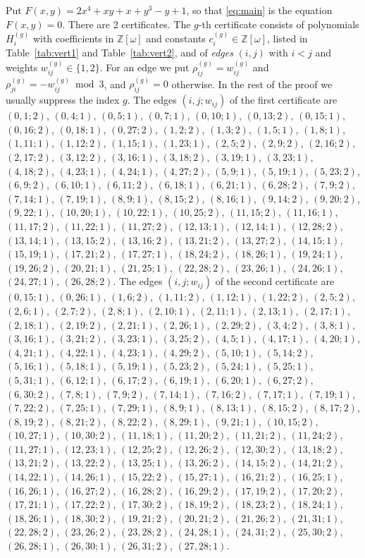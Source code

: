 \documentclass[11pt]{article}
\newcommand{\Z}{\mathbb{Z}}
\begin{document}
Put $F(x,y)=2x^{4}+xy+x+y^{3}-y+1$, so that \eqref{eq:main} is the equation $F(x,y)=0$. There are 2 certificates. The $g$-th certificate consists of polynomials $H^{(g)}_i$ with coefficients in $\Z[\omega]$ and constants $c^{(g)}_i\in\Z[\omega]$, listed in Table~\ref{tab:vert1} and Table~\ref{tab:vert2}, and of \emph{edges} $(i,j)$ with $i<j$ and weights $w^{(g)}_{ij}\in\{1,2\}$. For an edge we put $\rho^{(g)}_{ij}=w^{(g)}_{ij}$ and $\rho^{(g)}_{ji}=-w^{(g)}_{ij}\bmod3$, and $\rho^{(g)}_{ij}=0$ otherwise. In the rest of the proof we usually suppress the index $g$.
The edges $(i,j;w_{ij})$ of the first certificate are $(0,1;2)$, $(0,4;1)$, $(0,5;1)$, $(0,7;1)$, $(0,10;1)$, $(0,13;2)$, $(0,15;1)$, $(0,16;2)$, $(0,18;1)$, $(0,27;2)$, $(1,2;2)$, $(1,3;2)$, $(1,5;1)$, $(1,8;1)$, $(1,11;1)$, $(1,12;2)$, $(1,15;1)$, $(1,23;1)$, $(2,5;2)$, $(2,9;2)$, $(2,16;2)$, $(2,17;2)$, $(3,12;2)$, $(3,16;1)$, $(3,18;2)$, $(3,19;1)$, $(3,23;1)$, $(4,18;2)$, $(4,23;1)$, $(4,24;1)$, $(4,27;2)$, $(5,9;1)$, $(5,19;1)$, $(5,23;2)$, $(6,9;2)$, $(6,10;1)$, $(6,11;2)$, $(6,18;1)$, $(6,21;1)$, $(6,28;2)$, $(7,9;2)$, $(7,14;1)$, $(7,19;1)$, $(8,9;1)$, $(8,15;2)$, $(8,16;1)$, $(9,14;2)$, $(9,20;2)$, $(9,22;1)$, $(10,20;1)$, $(10,22;1)$, $(10,25;2)$, $(11,15;2)$, $(11,16;1)$, $(11,17;2)$, $(11,22;1)$, $(11,27;2)$, $(12,13;1)$, $(12,14;1)$, $(12,28;2)$, $(13,14;1)$, $(13,15;2)$, $(13,16;2)$, $(13,21;2)$, $(13,27;2)$, $(14,15;1)$, $(15,19;1)$, $(17,21;2)$, $(17,27;1)$, $(18,24;2)$, $(18,26;1)$, $(19,24;1)$, $(19,26;2)$, $(20,21;1)$, $(21,25;1)$, $(22,28;2)$, $(23,26;1)$, $(24,26;1)$, $(24,27;1)$, $(26,28;2)$.
The edges $(i,j;w_{ij})$ of the second certificate are $(0,15;1)$, $(0,26;1)$, $(1,6;2)$, $(1,11;2)$, $(1,12;1)$, $(1,22;2)$, $(2,5;2)$, $(2,6;1)$, $(2,7;2)$, $(2,8;1)$, $(2,10;1)$, $(2,11;1)$, $(2,13;1)$, $(2,17;1)$, $(2,18;1)$, $(2,19;2)$, $(2,21;1)$, $(2,26;1)$, $(2,29;2)$, $(3,4;2)$, $(3,8;1)$, $(3,16;1)$, $(3,21;2)$, $(3,23;1)$, $(3,25;2)$, $(4,5;1)$, $(4,17;1)$, $(4,20;1)$, $(4,21;1)$, $(4,22;1)$, $(4,23;1)$, $(4,29;2)$, $(5,10;1)$, $(5,14;2)$, $(5,16;1)$, $(5,18;1)$, $(5,19;1)$, $(5,23;2)$, $(5,24;1)$, $(5,25;1)$, $(5,31;1)$, $(6,12;1)$, $(6,17;2)$, $(6,19;1)$, $(6,20;1)$, $(6,27;2)$, $(6,30;2)$, $(7,8;1)$, $(7,9;2)$, $(7,14;1)$, $(7,16;2)$, $(7,17;1)$, $(7,19;1)$, $(7,22;2)$, $(7,25;1)$, $(7,29;1)$, $(8,9;1)$, $(8,13;1)$, $(8,15;2)$, $(8,17;2)$, $(8,19;2)$, $(8,21;2)$, $(8,22;2)$, $(8,29;1)$, $(9,21;1)$, $(10,15;2)$, $(10,27;1)$, $(10,30;2)$, $(11,18;1)$, $(11,20;2)$, $(11,21;2)$, $(11,24;2)$, $(11,27;1)$, $(12,23;1)$, $(12,25;2)$, $(12,26;2)$, $(12,30;2)$, $(13,18;2)$, $(13,21;2)$, $(13,22;2)$, $(13,25;1)$, $(13,26;2)$, $(14,15;2)$, $(14,21;2)$, $(14,22;1)$, $(14,26;1)$, $(15,22;2)$, $(15,27;1)$, $(16,21;2)$, $(16,25;1)$, $(16,26;1)$, $(16,27;2)$, $(16,28;2)$, $(16,29;2)$, $(17,19;2)$, $(17,20;2)$, $(17,21;1)$, $(17,22;2)$, $(17,30;2)$, $(18,19;2)$, $(18,23;2)$, $(18,24;1)$, $(18,26;1)$, $(18,30;2)$, $(19,21;2)$, $(20,21;2)$, $(21,26;2)$, $(21,31;1)$, $(22,28;2)$, $(23,26;2)$, $(23,28;2)$, $(24,28;1)$, $(24,31;2)$, $(25,30;2)$, $(26,28;1)$, $(26,30;1)$, $(26,31;2)$, $(27,28;1)$.
\end{document}
